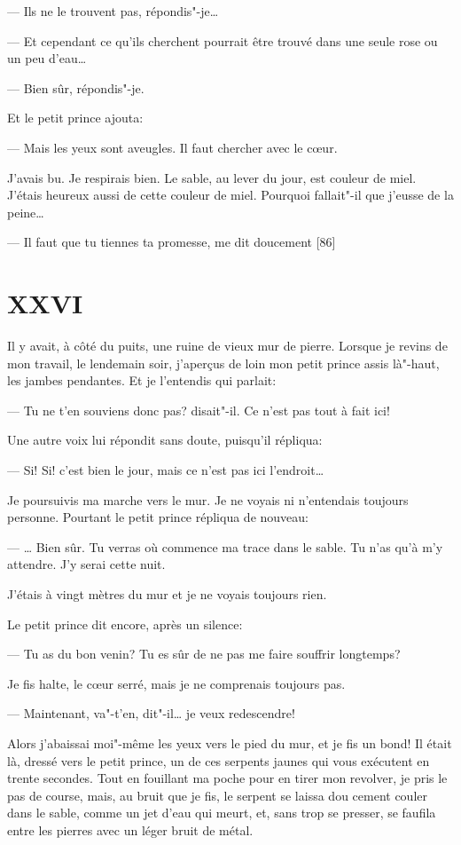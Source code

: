 --- Ils ne le trouvent pas, répondis"-je\ldots{}

--- Et cependant ce qu'ils cherchent pourrait être trouvé dans une seule rose ou un
peu d'eau\ldots{}

--- Bien sûr, répondis"-je.

Et le petit prince ajouta:

--- Mais les yeux sont aveugles. Il faut chercher avec le cœur.

\medskip

J'avais bu. Je respirais bien. Le sable, au lever du jour, est couleur de miel.
J'étais heureux aussi de cette couleur de miel. Pourquoi fallait"-il que j'eusse
de la peine\ldots{}

--- Il faut que tu tiennes ta promesse, me dit doucement [86]

\section{XXVI}
Il y avait, à côté du puits, une ruine de vieux mur de pierre. Lorsque je
revins de mon travail, le lendemain soir, j'aperçus de loin mon petit prince
assis là"-haut, les jambes pendantes. Et je l'entendis qui parlait:

--- Tu ne t'en souviens donc pas? disait"-il. Ce n'est pas tout à fait ici!

Une autre voix lui répondit sans doute, puisqu'il répliqua:

--- Si! Si! c'est bien le jour, mais ce n'est pas ici l'endroit\ldots{}

Je poursuivis ma marche vers le mur. Je ne voyais ni n'entendais toujours
personne. Pourtant le petit prince répliqua de nouveau:

--- \ldots{} Bien sûr. Tu verras où commence ma trace dans le sable. Tu n'as
qu’à m'y attendre. J'y serai cette nuit.

J'étais à vingt mètres du mur et je ne voyais toujours rien.

Le petit prince dit encore, après un silence:

--- Tu as du bon venin? Tu es sûr de ne pas me faire souffrir longtemps?

Je fis halte, le cœur serré, mais je ne comprenais toujours pas.

--- Maintenant, va"-t'en, dit"-il\ldots{} je veux redescendre!

Alors j'abaissai moi"-même les yeux vers le pied du mur, et je fis un bond!
Il était là, dressé vers le petit prince, un de ces serpents jaunes qui vous
exécutent en trente secondes. Tout en fouillant ma poche pour en tirer mon
revolver, je pris le pas de course, mais, au bruit que je fis, le serpent se
laissa dou cement couler dans le sable, comme un jet d'eau qui meurt, et,
sans trop se presser, se faufila entre les pierres avec un léger bruit de
métal.

